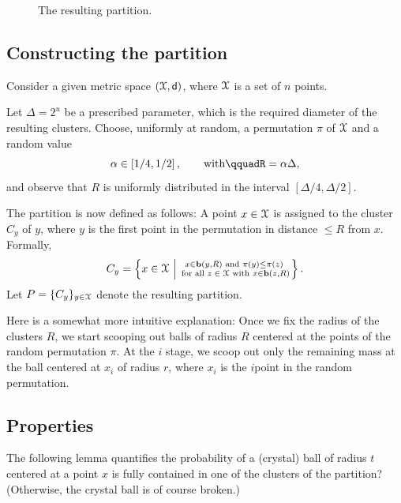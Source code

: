 \begin{figure}[t]
    \centerline{%
    }%
    \caption{The resulting partition.}
\end{figure}


\subsection{Constructing the partition}

Consider a given metric space $(\FMS, \DistChar)$, where $\FMS$ is a
set of $n$ points.

Let $\Delta = 2^u$ be a prescribed parameter, which is the required
diameter of the resulting clusters.  Choose, uniformly at random, a
permutation $\pi$ of $\FMS$ and a random value
\[
    \alpha \in \pbrcS{\nfrac{1}{4},\nfrac{1}{2}},%
    \qquad\text{with}\qquad%
    R = \alpha \Delta,
\]
and observe that $R$ is uniformly distributed in the interval
$[\Delta/4, \Delta/2]$.

The partition is now defined as follows: A point $x\in \FMS$ is assigned
to the cluster $C_y$ of $y$, where $y$ is the first point in the
permutation in distance $\leq R$ from $x$. Formally,
\begin{equation*}
C_y = \brc{ x \in \FMS \sep{ \substack{ x \in \Ball(y, R) \textrm { and } \pi(y)
      \leq \pi(z) \\ \textrm{ for all $z \in \FMS$ with } x \in \Ball(z,
      R)}}}.
\end{equation*}
Let $P = \{C_y\}_{y \in \FMS}$ denote the resulting partition.

Here is a somewhat more intuitive explanation: Once we fix the radius
of the clusters $R$, we start scooping out balls of radius $R$
centered at the points of the random permutation $\pi$. At the $i$\th
stage, we scoop out only the remaining mass at the ball centered at
$x_i$ of radius $r$, where $x_i$ is the $i$\th point in the random
permutation.


\subsection{Properties}

The following lemma quantifies the probability of a (crystal) ball of
radius $t$ centered at a point $x$ is fully contained in one of the
clusters of the partition? (Otherwise, the crystal ball is of course
broken.)

